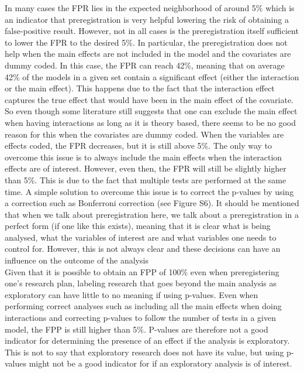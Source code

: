 In many cases the FPR lies in the expected neighborhood of around 5\% which is an indicator that preregistration is very helpful lowering the risk of obtaining a false-positive result. However, not in all cases is the preregistration itself sufficient to lower the FPR to the desired 5\%. In particular, the preregistration does not help when the main effects are not included in the model and the covariates are dummy coded. In this case, the FPR can reach 42\%, meaning that on average 42\% of the models in a given set contain a significant effect (either the interaction or the main effect). This happens due to the fact that the interaction effect captures the true effect that would have been in the main effect of the covariate. So even though some literature still suggests that one can exclude the main effect when having interactions as long as it is theory based, there seems to be no good reason for this when the covariates are dummy coded. When the variables are effects coded, the FPR decreases, but it is still above 5\%. The only way to overcome this issue is to always include the main effects when the interaction effects are of interest. However, even then, the FPR will still be slightly higher than 5\%. This is due to the fact that multiple tests are performed at the same time. A simple solution to overcome this issue is to correct the p-values by  using a correction such as Bonferroni correction \citep{dunn1961multiple} (see Figure S6).
It should be mentioned that when we talk about preregistration here, we talk about a preregistration in a perfect form (if one like this exists), meaning that it is clear what is being analysed, what the variables of interest are and what variables one needs to control for. However, this is not always clear and these decisions can have an influence on the outcome of the analysis \citep{Bryan25535,gilbert2016comment} \\

Given that it is possible to obtain an FPP of 100\% even when preregistering one's research plan, labeling research that goes beyond the main analysis as exploratory can have little to no meaning if using p-values. Even when performing correct analyses such as including all the main effects when doing interactions and correcting p-values to follow the number of tests in a given model, the FPP is still higher than 5\%. P-values are therefore not a good indicator for determining the presence of an effect if the analysis is exploratory. This is not to say that exploratory research does not have its value, but using p-values might not be a good indicator for if an exploratory analysis is of interest. \\
    
